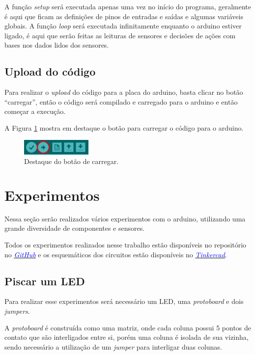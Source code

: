 \documentclass[12pt]{article}
\begin{document}
	A função \textit{setup} será executada apenas uma vez no início do programa, geralmente é aqui que ficam as definições de pinos de entradas e saídas e algumas variáveis globais.
	A função \textit{loop} será executada infinitamente enquanto o arduino estiver ligado, é aqui que serão feitas as leituras de sensores e decisões de ações com bases nos dados lidos dos sensores.

\subsection{Upload do código}
	Para realizar o \textit{upload} do código para a placa do arduino, basta clicar no botão ``carregar'', então o código será compilado e carregado para o arduino e então começar a execução.

	A Figura \ref{figCarregarIDE} mostra em destaque o botão para carregar o código para o arduino.

	\begin{figure}[H]
		\centering
		\includegraphics[scale=1]{Imagens/carregarIDE.png}
		\caption{Destaque do botão de carregar.}
		\label{figCarregarIDE}
	\end{figure}

\section{Experimentos}
	Nessa seção serão realizados vários experimentos com o arduino, utilizando uma grande diversidade de componentes e sensores.

	Todos os experimentos realizados nesse trabalho estão disponíveis no repositório no \href{https://github.com/ramires352/Arduino-UEM}{\underline{\textcolor{blue}{\textit{GitHub}}}} e os esquemáticos dos circuitos estão disponíveis no \href{https://www.tinkercad.com/users/8OFhdueEmAr-rrramires?category=circuits&sort=likes&view_mode=default}{\underline{\textcolor{blue}{\textit{Tinkercad}}}}.

\subsection{Piscar um LED}
	Para realizar esse experimentos será necessário um LED, uma \textit{protoboard} e dois \textit{jumpers}.

	A \textit{protoboard} é construída como uma matriz, onde cada coluna possui 5 pontos de contato que são interligados entre si, porém uma coluna é isolada de sua vizinha, sendo necessário a utilização de um \textit{jumper} para interligar duas colunas.
\end{document}
